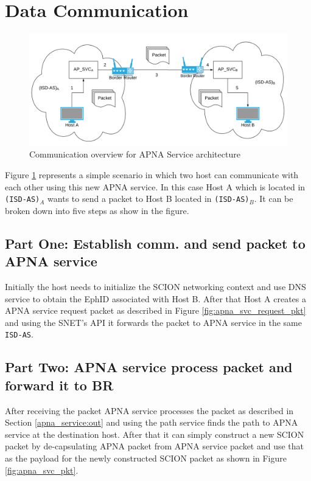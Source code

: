 \section{Data Communication} \label{srv:comm}
\begin{figure}[th!!]
\centering
\hspace*{-1cm}\includegraphics[scale=0.35]{Figures/svc_arch.png}
\decoRule
\caption[Communication overview for APNA Service]{Communication overview for APNA Service architecture}
\label{fig:srv_comm}
\end{figure}
Figure \ref{fig:srv_comm} represents a simple scenario in which two host can communicate with each other using this new APNA service. In this case Host A which is located in \texttt{(ISD-AS)}$_A$ wants to send a packet to Host B located in \texttt{(ISD-AS)}$_B$. It can be broken down into five steps as show in the figure. 

\subsection{Part One: Establish comm. and send packet to APNA service}
Initially the host needs to initialize the SCION networking context and use DNS service to obtain the EphID associated with Host B. After that Host A creates a APNA service request packet as described in Figure \ref{fig:apna_svc_request_pkt} and using the SNET's API it forwards the packet to APNA service in the same \texttt{ISD-AS}. 

\subsection{Part Two: APNA service process packet and forward it to BR}
After receiving the packet APNA service processes the packet as described in Section \ref{apna_service:out} and using the path service finds the path to APNA service at the destination host. After that it can simply construct a new SCION packet by de-capsulating APNA packet from APNA service packet and use that as the payload for the newly constructed SCION packet as shown in Figure \ref{fig:apna_svc_pkt}. 


